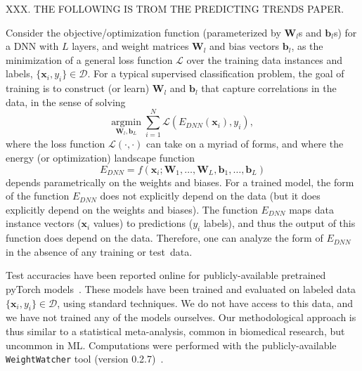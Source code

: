 \documentclass{article}
\begin{document}
XXX.  THE FOLLOWING IS TROM THE PREDICTING TRENDS PAPER.

Consider the objective/optimization function (parameterized by $\mathbf{W}_{l}$s and $\mathbf{b}_{l}$s) for a DNN with $L$ layers, and weight matrices $\mathbf{W}_{l}$ and bias vectors $\mathbf{b}_{l}$, as 
the minimization of a general loss function $\mathcal{L}$ over the training data instances and labels, $\{\mathbf{x}_{i},y_{i}\}\in\mathcal{D}$.
For a typical supervised classification problem, the goal of training is to construct (or learn) $\mathbf{W}_{l}$ and $\mathbf{b}_{l}$ that capture correlations in the data, in the sense of solving
\begin{equation}
\underset{\mathbf{W}_{l},\mathbf{b}_{L}}{\text{argmin}}\;\sum_{i=1}^{N} \mathcal{L}(E_{DNN}(\mathbf{x}_{i}),y_{i})   ,
\end{equation}
where the loss function $\mathcal{L}(\cdot,\cdot)$ can take on a myriad of forms, and where the energy (or optimization) landscape function
\begin{equation}
E_{DNN} = f(\mathbf{x}_{i} ; \mathbf{W}_{1},\ldots,\mathbf{W}_{L},\mathbf{b}_{1},\ldots,\mathbf{b}_{L})
\label{eqn:dnn_energy}
\end{equation}
depends parametrically on the weights and biases.
For a trained model, the form of the function $E_{DNN}$ does not explicitly depend on the data (but it does explicitly depend on the weights and biases).
The function $E_{DNN}$ maps data instance vectors ($\mathbf{x}_i$ values) to predictions ($y_{i}$ labels), and thus the output of this function does depend on the data.
Therefore, one can analyze the form of $E_{DNN}$ in the absence of any training or test~data. 

Test accuracies have been reported online for publicly-available pretrained pyTorch models~\cite{osmr}.
These models have been trained and evaluated on labeled data $\{\mathbf{x}_{i},y_{i}\}\in\mathcal{D}$, using standard techniques.  
We do not have access to this data, and we have not trained any of the models ourselves. 
Our methodological approach is thus similar to a statistical meta-analysis, common in biomedical research, but uncommon in ML.
%
Computations were performed with the publicly-available \texttt{WeightWatcher} tool (version 0.2.7)~\cite{weightwatcher_package}.
\end{document}
